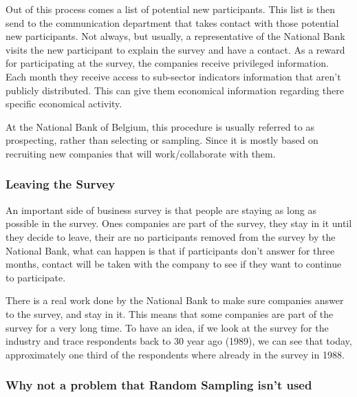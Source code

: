 \documentclass[12pt,a4paper,oneside]{book}
\begin{document}
Out of this process comes a list of potential new participants. This list is then send to the communication department that takes  contact with those potential new participants. 
Not always, but usually, a representative of the National Bank visits the new participant to explain the survey and have a contact.
As a reward for participating at the survey, the companies receive privileged information. Each month they receive access to sub-sector indicators information that aren't publicly distributed. This can give them economical information regarding there specific economical activity.

At the National Bank of Belgium, this procedure is usually referred to as prospecting, rather than selecting or sampling. Since it is mostly based on recruiting new companies that will work/collaborate with them. 



\subsubsection{Leaving the Survey}

An important side of business survey is that people are staying as long as possible in the survey.
Ones  companies are part of the survey, they stay in it until they decide to leave, their are no participants removed from the survey by the National Bank, what can happen is that if participants don't answer for three months, contact will be taken with the company to see if they want to continue to participate.

There is a real work done by the National Bank to make sure companies answer to the survey, and stay in it.
This means that some companies are part of the survey for a very long time.
To have an idea, if we look at the survey for the industry and trace respondents back to 30 year ago (1989), we can see that today, approximately one third of the respondents where already in the survey in 1988. 

\subsubsection{Why not a problem that Random Sampling isn't used}
\end{document}
